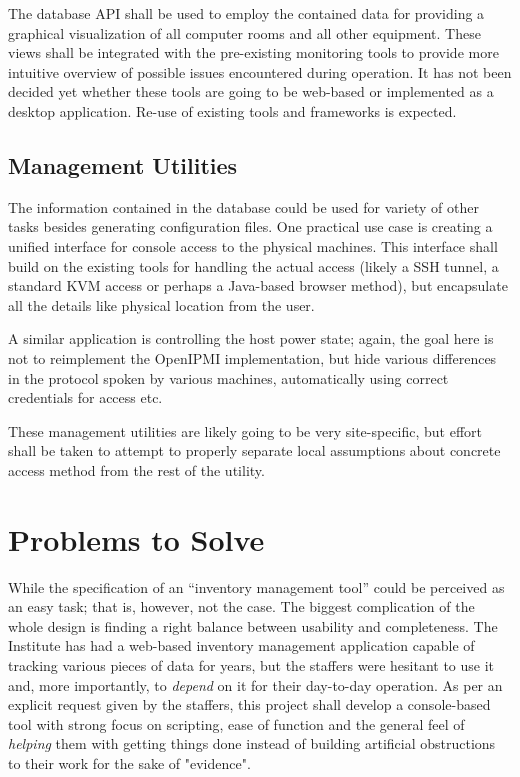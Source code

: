 \documentclass{article}
\begin{document}
The database API shall be used to employ the contained data for providing a graphical visualization of all computer rooms and all
other equipment.  These views shall be integrated with the pre-existing monitoring tools to provide more intuitive overview of
possible issues encountered during operation.  It has not been decided yet whether these tools are going to be web-based or
implemented as a desktop application.  Re-use of existing tools and frameworks is expected.

\subsection{Management Utilities}

The information contained in the database could be used for variety of other tasks besides generating configuration files.  One
practical use case is creating a unified interface for console access to the physical machines.  This interface shall build on the
existing tools for handling the actual access (likely a SSH tunnel, a standard KVM access or perhaps a Java-based browser method),
but encapsulate all the details like physical location from the user.

A similar application is controlling the host power state; again, the goal here is not to reimplement the OpenIPMI implementation,
but hide various differences in the protocol spoken by various machines, automatically using correct credentials for access etc.

These management utilities are likely going to be very site-specific, but effort shall be taken to attempt to properly separate
local assumptions about concrete access method from the rest of the utility.

\section{Problems to Solve}

While the specification of an ``inventory management tool'' could be perceived as an easy task; that is, however, not the case.
The biggest complication of the whole design is finding a right balance between usability and completeness.  The Institute has had
a web-based inventory management application capable of tracking various pieces of data for years, but the staffers were hesitant
to use it and, more importantly, to {\em depend} on it for their day-to-day operation.  As per an explicit request given by the
staffers, this project shall develop a console-based tool with strong focus on scripting, ease of function and the general feel of
{\em helping} them with getting things done instead of building artificial obstructions to their work for the sake of "evidence".
\end{document}
